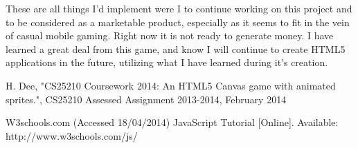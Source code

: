 \documentclass{article}
\begin{document}
These are all things I'd implement were I to continue working on this project and to be considered as a marketable product, especially as it seems to fit in the vein of casual mobile gaming. Right now it is not ready to generate money. I have learned a great deal from this game, and know I will continue to create HTML5 applications in the future, utilizing what I have learned during it's creation. 

\clearpage


\begin{thebibliography}{1}

 H. Dee, "CS25210 Coursework 2014: An HTML5 Canvas game with animated sprites.", CS25210 Assessed Assignment 2013-2014, February 2014

 W3schools.com (Accessed 18/04/2014) JavaScript Tutorial [Online]. Available: http://www.w3schools.com/js/



\end{thebibliography}
\end{document}
